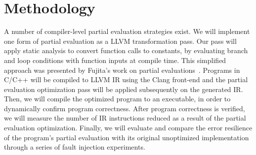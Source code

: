 \section{Methodology}
\label{sec:methodology}

A number of compiler-level partial evaluation strategies exist.
We will implement one form of partial evaluation as a LLVM transformation pass.
Our pass will apply static analysis to convert function calls to constants, by evaluating branch and loop conditions with function inputs at compile time.
This simplified approach was presented by Fujita’s work on partial evaluations~\cite{Fujita}.
Programs in C/C++ will be compiled to LLVM IR using the Clang front-end and the partial evaluation optimization pass will be applied subsequently on the generated IR.
Then, we will compile the optimized program to an executable, in order to dynamically confirm program correctness.
After program correctness is verified, we will measure the number of IR instructions reduced as a result of the partial evaluation optimization.
Finally, we will evaluate and compare the error resilience of the program’s partial evaluation with its original unoptimized implementation through a series of fault injection experiments.

